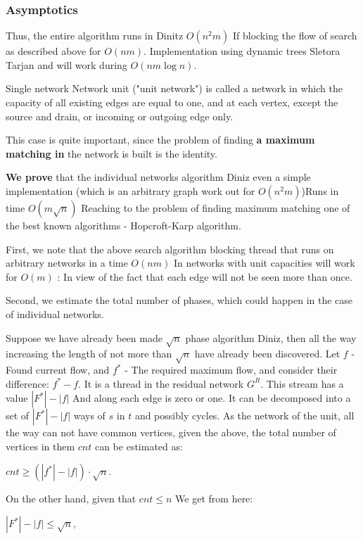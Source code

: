\subsubsection{ Asymptotics }

Thus, the entire algorithm runs in Dinitz $O (n ^ 2 m)$ If blocking the flow of search as described above for $O (n m)$. Implementation using dynamic trees Sletora Tarjan and will work during $O (n m \log n)$.

Single network
Network unit ("unit network") is called a network in which the capacity of all existing edges are equal to one, and at each vertex, except the source and drain, or incoming or outgoing edge only.

This case is quite important, since the problem of finding \textbf{a maximum matching in} the network is built is the identity.

\textbf{We prove} that the individual networks algorithm Diniz even a simple implementation (which is an arbitrary graph work out for $O (n ^ 2 m)$)Runs in time $O (m \sqrt {n})$ Reaching to the problem of finding maximum matching one of the best known algorithms - Hopcroft-Karp algorithm.

First, we note that the above search algorithm blocking thread that runs on arbitrary networks in a time $O (n m)$ In networks with unit capacities will work for $O (m)$ : In view of the fact that each edge will not be seen more than once.

Second, we estimate the total number of phases, which could happen in the case of individual networks.

Suppose we have already been made $\sqrt {n}$ phase algorithm Diniz, then all the way increasing the length of not more than $\sqrt {n}$ have already been discovered. Let $f$ - Found current flow, and $f ^ *$ - The required maximum flow, and consider their difference: $f ^ * - f$. It is a thread in the residual network $G ^ R$. This stream has a value $| F ^ * | - | f |$ And along each edge is zero or one. It can be decomposed into a set of $| F ^ * | - | f |$ ways of $s$ in $t$ and possibly cycles. As the network of the unit, all the way can not have common vertices, given the above, the total number of vertices in them $cnt$ can be estimated as:

$cnt \ge (| f ^ * | - | f |) \cdot \sqrt {n}.$

On the other hand, given that $cnt \le n$ We get from here:

$| F ^ * | - | f | \le \sqrt {n},$

